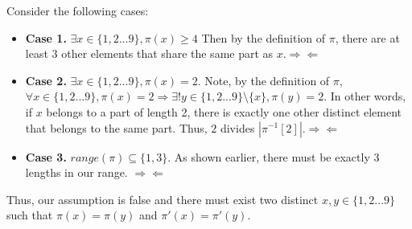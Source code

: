 \documentclass{article}
\begin{document}
Consider the following cases:
\begin{itemize}
  \item \textbf{Case 1.} $\exists x \in \{1,2...9\}, \pi(x)\geq 4$
        Then by the definition of $\pi$, there are at least 3 other elements
        that share the same part as $x. \Rightarrow\Leftarrow$
  \item \textbf{Case 2.} $\exists x \in \{1,2...9\}, \pi(x)=2$.
        Note, by the definition of $\pi$, 
        $\forall x \in \{1,2...9\}, \pi(x)=2 \Rightarrow 
         \exists! y \in \{1,2...9\}\setminus \{x\}, \pi(y)=2$.
        In other words, if $x$ belongs to a part of length 2, there is 
        exactly one other distinct element that belongs to the same part.
        Thus, $2$ divides $|\pi^{-1}[2]|. \Rightarrow\Leftarrow$
  \item \textbf{Case 3.} $range(\pi)\subseteq\{1,3\}$. As shown earlier,
        there must be exactly 3 lengths in our range. $\Rightarrow\Leftarrow$
\end{itemize}

Thus, our assumption is false and there must exist two distinct 
$x,y \in \{1,2...9\}$ such that $\pi(x)=\pi(y)$ and $\pi'(x)=\pi'(y)$.
\end{document}
